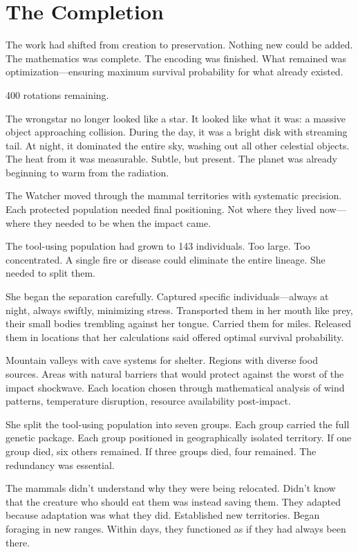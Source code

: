 \chapter{The Completion}
\label{ch:11}


The work had shifted from creation to preservation. Nothing new could be added. The mathematics was complete. The encoding was finished. What remained was optimization—ensuring maximum survival probability for what already existed.

400 rotations remaining.

The wrongstar no longer looked like a star. It looked like what it was: a massive object approaching collision. During the day, it was a bright disk with streaming tail. At night, it dominated the entire sky, washing out all other celestial objects. The heat from it was measurable. Subtle, but present. The planet was already beginning to warm from the radiation.

The Watcher moved through the mammal territories with systematic precision. Each protected population needed final positioning. Not where they lived now—where they needed to be when the impact came.

\scenebreak

The tool-using population had grown to 143 individuals. Too large. Too concentrated. A single fire or disease could eliminate the entire lineage. She needed to split them.

She began the separation carefully. Captured specific individuals—always at night, always swiftly, minimizing stress. Transported them in her mouth like prey, their small bodies trembling against her tongue. Carried them for miles. Released them in locations that her calculations said offered optimal survival probability.

Mountain valleys with cave systems for shelter. Regions with diverse food sources. Areas with natural barriers that would protect against the worst of the impact shockwave. Each location chosen through mathematical analysis of wind patterns, temperature disruption, resource availability post-impact.

She split the tool-using population into seven groups. Each group carried the full genetic package. Each group positioned in geographically isolated territory. If one group died, six others remained. If three groups died, four remained. The redundancy was essential.

The mammals didn't understand why they were being relocated. Didn't know that the creature who should eat them was instead saving them. They adapted because adaptation was what they did. Established new territories. Began foraging in new ranges. Within days, they functioned as if they had always been there.

